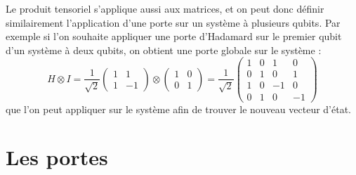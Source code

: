 Le produit tensoriel s'applique aussi aux matrices, et on peut donc définir similairement
l'application d'une porte sur un système à plusieurs qubits.
Par exemple si l'on souhaite appliquer une porte d'Hadamard sur le premier qubit d'un
système à deux qubits, on obtient une porte globale sur le système :
\[H \otimes I = \frac{1}{\sqrt{2}} \begin{pmatrix}
  1 & 1 \\
  1 & -1
\end{pmatrix} \otimes \begin{pmatrix}
    1 & 0 \\
    0 & 1
\end{pmatrix} = \frac{1}{\sqrt{2}} \begin{pmatrix}
    1 & 0 & 1 & 0 \\
    0 & 1 & 0 & 1 \\
    1 & 0 & -1 & 0 \\
    0 & 1 & 0 & -1
\end{pmatrix}\]
que l'on peut appliquer sur le système afin de trouver le nouveau vecteur d'état.

\section{Les portes}\label{sec:les-portes}

